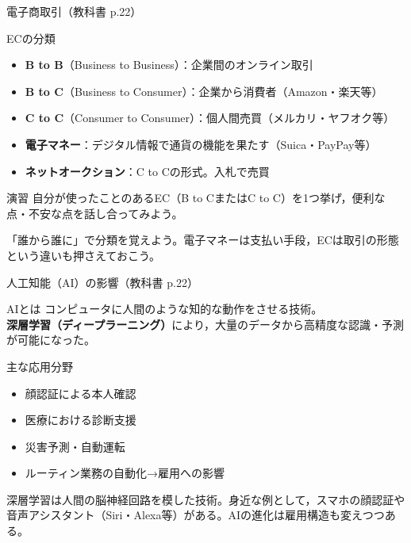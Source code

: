 \documentclass[aspectratio=43,professionalfonts,handout,10pt]{beamer}
\begin{document}
\begin{frame}{電子商取引（教科書 p.22）}
  \begin{block}{ECの分類}
    \small
    \begin{itemize}
      \item \textbf{B to B}（Business to Business）：企業間のオンライン取引
      \item \textbf{B to C}（Business to Consumer）：企業から消費者（Amazon・楽天等）
      \item \textbf{C to C}（Consumer to Consumer）：個人間売買（メルカリ・ヤフオク等）
      \item \textbf{電子マネー}：デジタル情報で通貨の機能を果たす（Suica・PayPay等）
      \item \textbf{ネットオークション}：C to Cの形式。入札で売買
    \end{itemize}
  \end{block}

  \begin{exampleblock}{演習}
    自分が使ったことのあるEC（B to CまたはC to C）を1つ挙げ，便利な点・不安な点を話し合ってみよう。
  \end{exampleblock}

  \begin{slidenote}
    「誰から誰に」で分類を覚えよう。電子マネーは支払い手段，ECは取引の形態という違いも押さえておこう。
  \end{slidenote}
\end{frame}


\begin{frame}{人工知能（AI）の影響（教科書 p.22）}
  \begin{block}{AIとは}
    \small
    コンピュータに人間のような知的な動作をさせる技術。\\
    \textbf{深層学習（ディープラーニング）}により，大量のデータから高精度な認識・予測が可能になった。
  \end{block}

  \begin{exampleblock}{主な応用分野}
    \small
    \begin{itemize}
      \item 顔認証による本人確認
      \item 医療における診断支援
      \item 災害予測・自動運転
      \item ルーティン業務の自動化→雇用への影響
    \end{itemize}
  \end{exampleblock}

  \begin{slidenote}
    深層学習は人間の脳神経回路を模した技術。身近な例として，スマホの顔認証や音声アシスタント（Siri・Alexa等）がある。AIの進化は雇用構造も変えつつある。
  \end{slidenote}
\end{frame}
\end{document}
